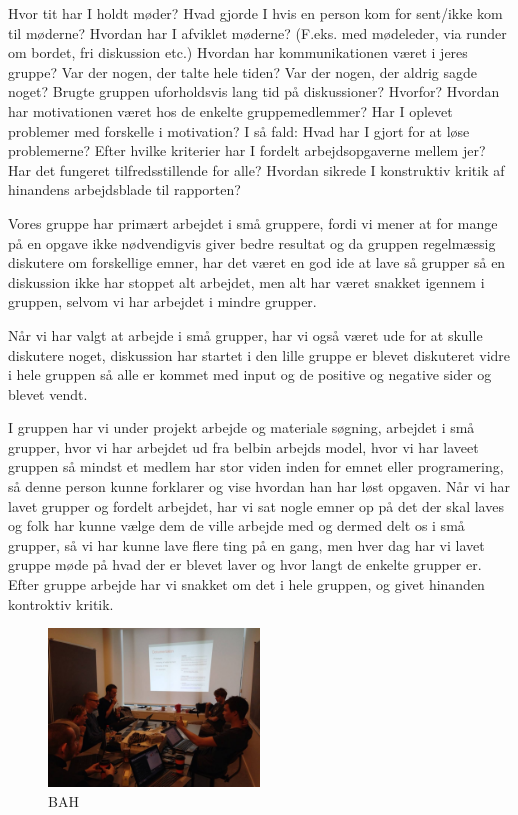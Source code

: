 \documentclass[a4paper,12pt,twoside,openright]{memoir}
\begin{document}
            Hvor tit har I holdt møder?  
            Hvad gjorde I hvis en person kom for sent/ikke kom til møderne? 
            Hvordan har I afviklet møderne? (F.eks. med mødeleder, via runder om bordet, fri diskussion etc.) 
            Hvordan har kommunikationen været i jeres gruppe? Var der nogen, der talte hele tiden? Var der nogen, der aldrig sagde noget? Brugte gruppen uforholdsvis lang tid på diskussioner? Hvorfor? 
            Hvordan har motivationen været hos de enkelte gruppemedlemmer? Har I oplevet problemer med forskelle i motivation? I så fald: Hvad har I gjort for at løse problemerne? 
            Efter hvilke kriterier har I fordelt arbejdsopgaverne mellem jer? Har det fungeret tilfredsstillende for alle? 
            Hvordan sikrede I konstruktiv kritik af hinandens arbejdsblade til rapporten? 



            Vores gruppe har primært arbejdet i små gruppere, fordi vi mener at for mange på en opgave ikke nødvendigvis giver bedre resultat og da gruppen regelmæssig diskutere om forskellige emner, har det været en god ide at lave så grupper så en diskussion ikke har stoppet alt arbejdet, men alt har været snakket igennem i gruppen, selvom vi har arbejdet i mindre grupper. 

            Når vi har valgt at arbejde i små grupper, har vi også været ude for at skulle diskutere noget, diskussion har startet i den lille gruppe er blevet diskuteret vidre i hele gruppen så alle er kommet med input og de positive og negative sider og blevet vendt.

            I gruppen har vi under projekt arbejde og materiale søgning, arbejdet i små grupper, hvor vi har arbejdet ud fra belbin arbejds model, hvor vi har laveet  gruppen så mindst et medlem har stor viden inden for emnet eller programering, så denne person kunne forklarer og vise hvordan han har løst opgaven. 
            Når vi har lavet grupper og fordelt arbejdet, har vi sat nogle emner op på det der skal laves og folk har kunne vælge dem de ville arbejde med og dermed delt os i små grupper, så vi har kunne lave flere ting på en gang, men hver dag har vi lavet gruppe møde på hvad der er blevet laver  og hvor langt de enkelte grupper er. Efter gruppe arbejde har vi snakket om det i hele gruppen, og givet  hinanden kontroktiv kritik.

            \begin{figure}[ht!]
                \centering
                \includegraphics[width=0.5\textwidth]{Images/8.jpg}
                \caption{BAH}
                \label{4}
            \end{figure}
\end{document}
